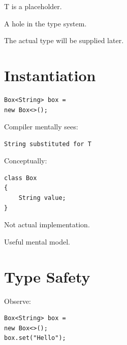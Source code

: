 \documentclass[11pt,a4paper]{book}
\begin{document}
\begin{mentalmodel}

T is a placeholder.


A hole in the type system.


The actual type will be supplied later.

\end{mentalmodel}


\section{Instantiation}

\begin{verbatim}
Box<String> box =
new Box<>();
\end{verbatim}


Compiler mentally sees:

\begin{verbatim}
String substituted for T
\end{verbatim}


Conceptually:

\begin{verbatim}
class Box
{
    String value;
}
\end{verbatim}


Not actual implementation.


Useful mental model.


\section{Type Safety}

Observe:

\begin{verbatim}
Box<String> box =
new Box<>();
box.set("Hello");
\end{verbatim}
\end{document}
